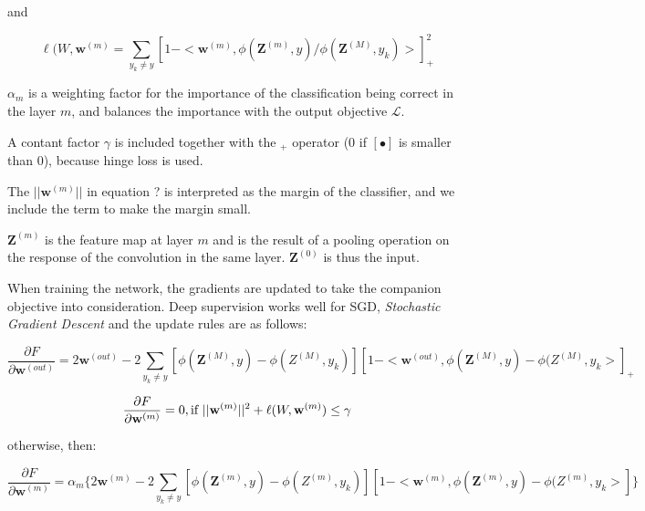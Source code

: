 and

\begin{equation}\label{eq:deep_loss}
\ell(W, \textbf{w}^{(m)} = \sum\limits_{y_k \neq y} [1 - < \textbf{w}^{(m)}, \phi(\textbf{Z}^{(m)}, y) / \phi(\textbf{Z}^{(M)}, y_k) >]^{2}_+
\end{equation}

$\alpha_m$ is a weighting factor for the importance of the classification being correct in the layer $m$, and balances the importance with the output objective $\mathcal{L}$.

A contant factor $\gamma$ is included together with the $_+$ operator (0 if $[\bullet]$ is smaller than 0), because hinge loss is used. %

The $||\textbf{w}^{(m)}||$ in equation ?%
 is interpreted as the margin of the classifier, and we include the term to make the margin small. 

$\textbf{Z}^{(m)}$ is the feature map at layer $m$ and is the result of a pooling operation on the response of the convolution in the same layer. $\textbf{Z}^{(0)}$ is thus the input.

When training the network, the gradients are updated to take the companion objective into consideration. Deep supervision works well for SGD, \emph{Stochastic Gradient Descent} and the update rules are as follows:

\begin{equation}
\frac{\partial F}{\partial \textbf{w}^{(out)}} = 2\textbf{w}^{(out)} - 2\sum\limits_{y_k \neq y}[\phi(\textbf{Z}^{(M)},y) - \phi({Z}^{(M)},y_k)][1 - <\textbf{w}^{(out)}, \phi(\textbf{Z}^{(M)},y) - \phi({Z}^{(M)},y_k>]_+
\end{equation}

\begin{equation}
\frac{\partial F}{\partial \textbf{w}^{(m)}} = 0, \text{if ||\textbf{w}$^{(m)}||^2 + \ell(W,\textbf{w}^{(m)}) \leq \gamma $}
\end{equation}

otherwise, then:

\begin{equation}
\frac{\partial F}{\partial \textbf{w}^{(m)}} =
\alpha_m\{2\textbf{w}^{(m)}-2\sum\limits_{y_k \neq y}[\phi(\textbf{Z}^{(m)},y) - \phi({Z}^{(m)},y_k)][1 - <\textbf{w}^{(m)}, \phi(\textbf{Z}^{(m)},y) - \phi({Z}^{(m)},y_k>] \}
\end{equation}

